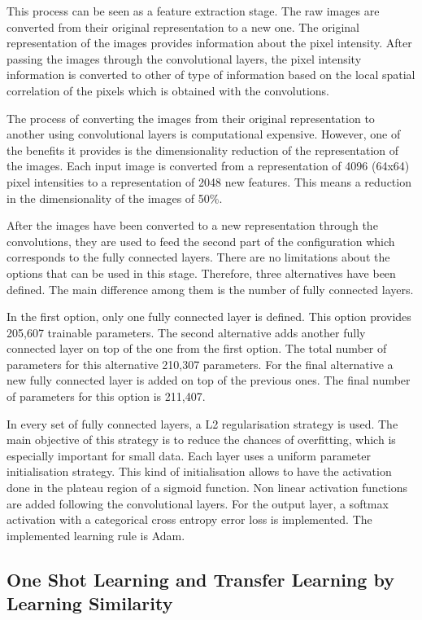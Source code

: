 \documentclass{article}
\begin{document}
This process can be seen as a feature extraction stage. The raw images are converted from their original representation to a new one. The original representation of the images provides information about the pixel intensity. After passing the images through the convolutional layers, the pixel intensity information is converted to other of type of information based on the local spatial correlation of the pixels which is obtained with the convolutions.

The process of converting the images from their original representation to another using convolutional layers is computational expensive. However, one of the benefits it provides is the dimensionality reduction of the representation of the images. Each input image is converted from a representation of 4096 (64x64) pixel intensities to a representation of 2048 new features. This means a reduction in the dimensionality of the images of 50\%.

After the images have been converted to a new representation through the convolutions, they are used to feed the second part of the configuration which corresponds to the fully connected layers. There are no limitations about the options that can be used in this stage. Therefore, three alternatives have been defined. The main difference among them is the number of fully connected layers.

In the first option, only one fully connected layer is defined. This option provides 205,607 trainable parameters. The second alternative adds another fully connected layer on top of the one from the first option. The total number of parameters for this alternative 210,307 parameters. For the final alternative a new fully connected layer is added on top of the previous ones. The final number of parameters for this option is 211,407.

In every set of fully connected layers, a L2 regularisation strategy is used. The main objective of this strategy is to reduce the chances of overfitting, which is especially important for small data. Each layer uses a uniform parameter initialisation strategy. This kind of initialisation allows to have the activation done in the plateau region of a sigmoid function. Non linear activation functions are added following the convolutional layers. For the output layer, a softmax activation with a categorical cross entropy error loss is implemented. The implemented learning rule is Adam.

\subsection{One Shot Learning and Transfer Learning by Learning Similarity}
\label{sec:oneshot}
\end{document}
